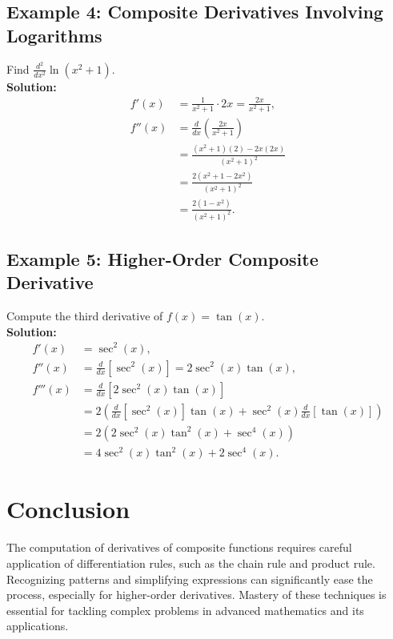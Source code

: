 \documentclass{article}
\begin{document}
\subsection{Example 4: Composite Derivatives Involving Logarithms}
Find $\frac{d^2}{dx^2} \ln(x^2 + 1)$. \\
\textbf{Solution:}
\begin{align*}
f'(x) &= \frac{1}{x^2 + 1} \cdot 2x = \frac{2x}{x^2 + 1}, \\
f''(x) &= \frac{d}{dx}\left(\frac{2x}{x^2 + 1}\right) \\
&= \frac{(x^2 + 1)(2) - 2x(2x)}{(x^2 + 1)^2} \\
&= \frac{2(x^2 + 1 - 2x^2)}{(x^2 + 1)^2} \\
&= \frac{2(1 - x^2)}{(x^2 + 1)^2}.
\end{align*}

\subsection{Example 5: Higher-Order Composite Derivative}
Compute the third derivative of $f(x) = \tan(x)$. \\
\textbf{Solution:}
\begin{align*}
f'(x) &= \sec^2(x), \\
f''(x) &= \frac{d}{dx}[\sec^2(x)] = 2\sec^2(x)\tan(x), \\
f'''(x) &= \frac{d}{dx}[2\sec^2(x)\tan(x)] \\
&= 2 \left(\frac{d}{dx}[\sec^2(x)] \tan(x) + \sec^2(x) \frac{d}{dx}[\tan(x)]\right) \\
&= 2 \left(2\sec^2(x)\tan^2(x) + \sec^4(x)\right) \\
&= 4\sec^2(x)\tan^2(x) + 2\sec^4(x).
\end{align*}

\section{Conclusion}
The computation of derivatives of composite functions requires careful application of differentiation rules, such as the chain rule and product rule. Recognizing patterns and simplifying expressions can significantly ease the process, especially for higher-order derivatives. Mastery of these techniques is essential for tackling complex problems in advanced mathematics and its applications.
\end{document}
